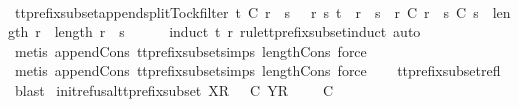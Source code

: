 \begin{isabellebody}
\ \ \isamarkupfalse%
%
\endisatagproof
{\isafoldproof}%
%
\isadelimproof
\isanewline
%
\endisadelimproof
\isanewline
{}\isamarkupfalse%
\ tt{\isacharunderscore}prefix{\isacharunderscore}subset{\isacharunderscore}append{\isacharunderscore}split{\isacharunderscore}Tock{\isacharunderscore}filter{\isacharcolon}\ {\isachardoublequoteopen}t\ {\isasymlesssim}\isactrlsub C\ r\ {\isacharat}\ s\ {\isasymLongrightarrow}\ {\isasymexists}\ r{\isacharprime}\ s{\isacharprime}{\isachardot}\ t\ {\isacharequal}\ r{\isacharprime}\ {\isacharat}\ s{\isacharprime}\ {\isasymand}\ r{\isacharprime}\ {\isasymlesssim}\isactrlsub C\ r\ {\isasymand}\ s{\isacharprime}\ {\isasymlesssim}\isactrlsub C\ s\ {\isasymand}\ {\isacharparenleft}length\ r{\isacharprime}\ {\isacharequal}\ length\ r\ {\isasymor}\ s{\isacharprime}\ {\isacharequal}\ {\isacharbrackleft}{\isacharbrackright}{\isacharparenright}{\isachardoublequoteclose}\isanewline
%
\isadelimproof
\ \ %
\endisadelimproof
%
\isatagproof
{}\isamarkupfalse%
\ {\isacharparenleft}induct\ t\ {\isachardoublequoteopen}r{\isachardoublequoteclose}\ rule{\isacharcolon}tt{\isacharunderscore}prefix{\isacharunderscore}subset{\isachardot}induct{\isacharcomma}\ auto{\isacharparenright}\isanewline
\ \ \isamarkupfalse%
\ {\isacharparenleft}metis\ append{\isacharunderscore}Cons\ tt{\isacharunderscore}prefix{\isacharunderscore}subset{\isachardot}simps{\isacharparenleft}{}{\isacharparenright}\ length{\isacharunderscore}Cons{\isacharcomma}\ force{\isacharparenright}\isanewline
\ \ \isamarkupfalse%
\ {\isacharparenleft}metis\ append{\isacharunderscore}Cons\ tt{\isacharunderscore}prefix{\isacharunderscore}subset{\isachardot}simps{\isacharparenleft}{}{\isacharparenright}\ length{\isacharunderscore}Cons{\isacharcomma}\ force{\isacharparenright}\isanewline
\ \ \isamarkupfalse%
\ tt{\isacharunderscore}prefix{\isacharunderscore}subset{\isacharunderscore}refl\ \isamarkupfalse%
\ blast%
\endisatagproof
{\isafoldproof}%
%
\isadelimproof
\isanewline
%
\endisadelimproof
\isanewline
{}\isamarkupfalse%
\ init{\isacharunderscore}refusal{\isacharunderscore}tt{\isacharunderscore}prefix{\isacharunderscore}subset{\isacharcolon}\ {\isachardoublequoteopen}{\isacharbrackleft}X{\isacharbrackright}\isactrlsub R\ {\isacharhash}\ {\isasymrho}\ {\isasymlesssim}\isactrlsub C\ {\isacharbrackleft}Y{\isacharbrackright}\isactrlsub R\ {\isacharhash}\ {\isasymsigma}\ {\isasymLongrightarrow}\ {\isasymrho}\ {\isasymlesssim}\isactrlsub C\ {\isasymsigma}{\isachardoublequoteclose}\isanewline

\end{isabellebody}
